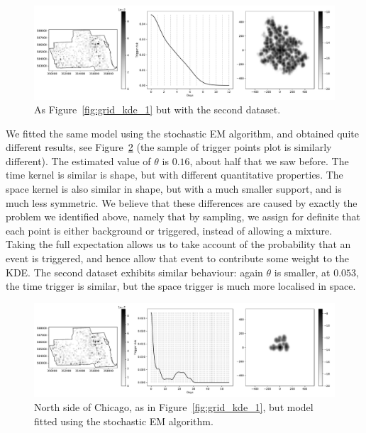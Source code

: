 \documentclass[twoside,a4paper]{article}
\theoremstyle{plain}
\theoremstyle{definition}
\begin{document}
\begin{figure}
  \includegraphics[width=\textwidth]{../notebooks/grid_kde_one_mod.pdf}
  \caption{As Figure~\ref{fig:grid_kde_1} but with the second dataset.}
  \label{fig:grid_kde_1_mod}
\end{figure}

We fitted the same model using the stochastic EM algorithm, and obtained quite different results,
see Figure~\ref{fig:grid_kde_2} (the sample of trigger points plot is similarly different).
The estimated value of $\theta$ is $0.16$, about half that we saw before.  The time kernel is
similar is shape, but with different quantitative properties.  The space kernel is also similar
in shape, but with a much smaller support, and is much less symmetric.
We believe that these differences are caused by
exactly the problem we identified above, namely that by sampling, we assign for definite that
each point is either background or triggered, instead of allowing a mixture.  Taking the full
expectation allows us to take account of the probability that an event is triggered, and hence
allow that event to contribute some weight to the KDE.  The second dataset exhibits
similar behaviour: again $\theta$ is smaller, at $0.053$, the time trigger is similar, but
the space trigger is much more localised in space.

\begin{figure}
  \includegraphics[width=\textwidth]{../notebooks/grid_kde_two.pdf}
  \caption{North side of Chicago, as in Figure~\ref{fig:grid_kde_1}, but model fitted using the
  stochastic EM algorithm.}
  \label{fig:grid_kde_2}
\end{figure}
\end{document}
